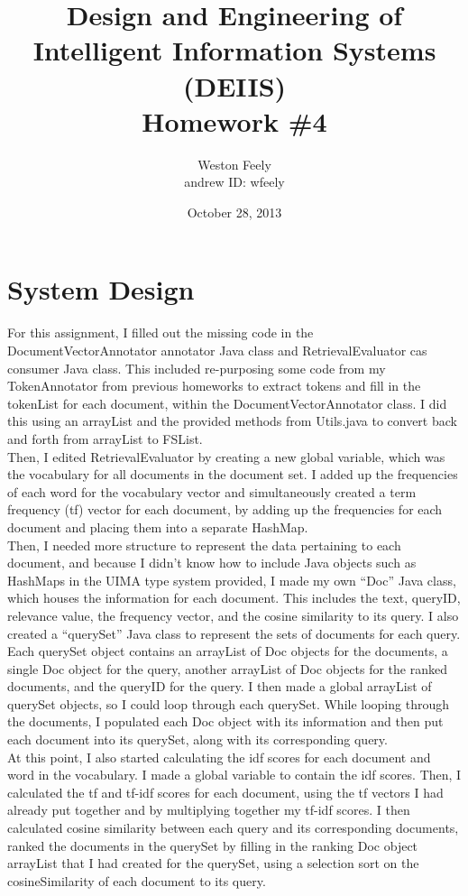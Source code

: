 \documentclass[11pt]{article}
\begin{document}
\title{\textbf{Design and Engineering of Intelligent Information Systems (DEIIS)}\\
	Homework \#4}
\author{Weston Feely \\ andrew ID: wfeely}
\date{October 28, 2013}
\maketitle

\section*{System Design}
For this assignment, I filled out the missing code in the DocumentVectorAnnotator annotator Java class and RetrievalEvaluator cas consumer Java class. This included re-purposing some code from my TokenAnnotator from previous homeworks to extract tokens and fill in the tokenList for each document, within the DocumentVectorAnnotator class. I did this using an arrayList and the provided methods from Utils.java to convert back and forth from arrayList to FSList. \\ 
Then, I edited RetrievalEvaluator by creating a new global variable, which was the vocabulary for all documents in the document set. I added up the frequencies of each word for the vocabulary vector and simultaneously created a term frequency (tf) vector for each document, by adding up the frequencies for each document and placing them into a separate HashMap. \\
Then, I needed more structure to represent the data pertaining to each document, and because I didn't know how to include Java objects such as HashMaps in the UIMA type system provided, I made my own ``Doc'' Java class, which houses the information for each document. This includes the text, queryID, relevance value, the frequency vector, and the cosine similarity to its query. I also created a ``querySet'' Java class to represent the sets of documents for each query. Each querySet object contains an arrayList of Doc objects for the documents, a single Doc object for the query, another arrayList of Doc objects for the ranked documents, and the queryID for the query. I then made a global arrayList of querySet objects, so I could loop through each querySet. While looping through the documents, I populated each Doc object with its information and then put each document into its querySet, along with its corresponding query. \\
At this point, I also started calculating the idf scores for each document and word in the vocabulary. I made a global variable to contain the idf scores. Then, I calculated the tf and tf-idf scores for each document, using the tf vectors I had already put together and by multiplying together my tf-idf scores. I then calculated cosine similarity between each query and its corresponding documents, ranked the documents in the querySet by filling in the ranking Doc object arrayList that I had created for the querySet, using a selection sort on the cosineSimilarity of each document to its query. \\
\end{document}
